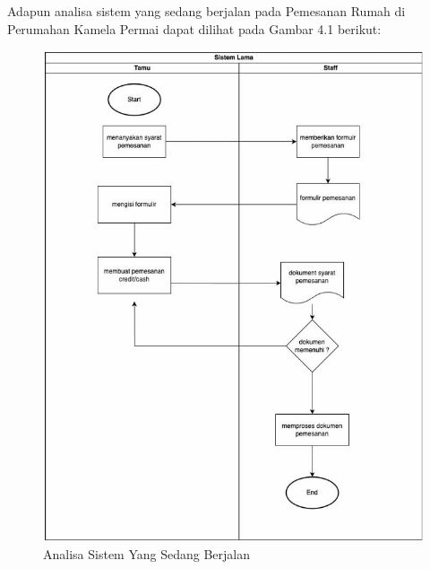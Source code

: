 \par Adapun analisa sistem yang sedang berjalan pada Pemesanan Rumah di Perumahan Kamela Permai dapat dilihat pada Gambar 4.1 berikut:
\begin{figure}
\centering
    \includegraphics[width=0.90\linewidth]{Analisa sistem yang sedang berjalan.png}
    \caption{Analisa Sistem Yang Sedang Berjalan}
\end{figure}
